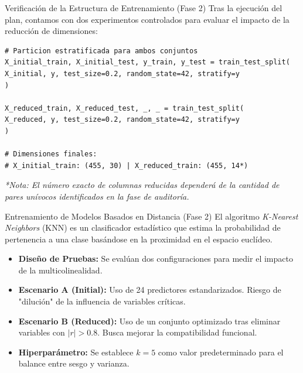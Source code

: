 \documentclass{beamer}
\begin{document}
	\begin{frame}[fragile]{Verificación de la Estructura de Entrenamiento (Fase 2)}
		Tras la ejecución del plan, contamos con dos experimentos controlados para evaluar el impacto de la reducción de dimensiones:
		
		\begin{lstlisting}[style=colab]
# Particion estratificada para ambos conjuntos
X_initial_train, X_initial_test, y_train, y_test = train_test_split(
X_initial, y, test_size=0.2, random_state=42, stratify=y
)

X_reduced_train, X_reduced_test, _, _ = train_test_split(
X_reduced, y, test_size=0.2, random_state=42, stratify=y
)

# Dimensiones finales:
# X_initial_train: (455, 30) | X_reduced_train: (455, 14*)
		\end{lstlisting}
		\textit{*Nota: El número exacto de columnas reducidas dependerá de la cantidad de pares unívocos identificados en la fase de auditoría.}
	\end{frame}
	
	
	
	\begin{frame}{Entrenamiento de Modelos Basados en Distancia (Fase 2)}
		El algoritmo \textit{K-Nearest Neighbors} (KNN) es un clasificador estadístico que estima la probabilidad de pertenencia a una clase basándose en la proximidad en el espacio euclídeo.
		
		\begin{itemize}
			\item<2-> \textbf{Diseño de Pruebas:} Se evalúan dos configuraciones para medir el impacto de la multicolinealidad.
			\item<3-> \textbf{Escenario A (Initial):} Uso de 24 predictores estandarizados. Riesgo de "dilución" de la influencia de variables críticas.
			\item<4-> \textbf{Escenario B (Reduced):} Uso de un conjunto optimizado tras eliminar variables con $|r| > 0.8$. Busca mejorar la compatibilidad funcional.
			\item<5-> \textbf{Hiperparámetro:} Se establece $k=5$ como valor predeterminado para el balance entre sesgo y varianza.
		\end{itemize}
	\end{frame}
	
\end{document}
